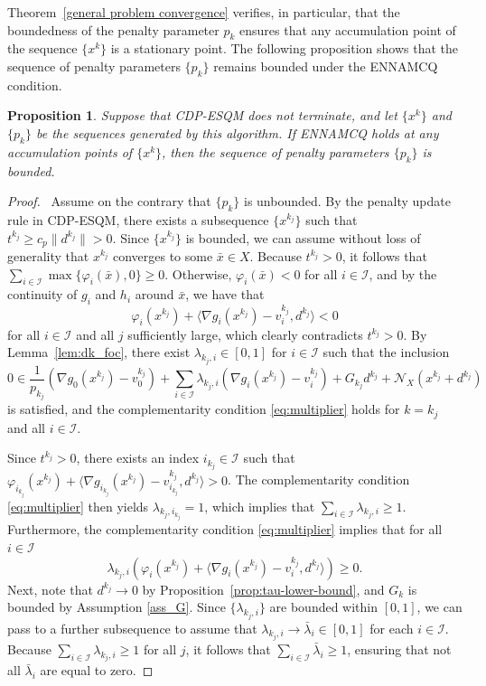 \documentclass[11pt,a4paper]{article}
\newtheorem{proposition}[theorem]{Proposition}
\theoremstyle{plain}
\begin{document}
Theorem~\ref{general problem convergence} verifies, in particular, that the boundedness of the penalty parameter $p_k$ ensures that any accumulation point of the sequence $\{x^k\}$ is a stationary point. The following proposition shows that the sequence of penalty parameters \( \{p_k\} \) remains bounded under the ENNAMCQ condition.

\begin{proposition}\label{boundedness of penalty parameter sequence}
Suppose that CDP-ESQM does not terminate, and  let \( \{x^k\} \) and $\{p_k\}$ be the sequences generated by this algorithm. If ENNAMCQ holds at any accumulation points of $\{x^{k}\}$, then the sequence of penalty parameters  $\{p_k\}$ is bounded.
\end{proposition}

\begin{proof}\,
Assume on the contrary that $\{p_k\}$ is unbounded. By the penalty update rule in CDP-ESQM, there exists a subsequence $\{x^{k_j}\}$ such that $t^{k_j} \ge c_p\|d^{k_j}\| > 0$. Since $\{x^{k_j}\}$ is bounded, we can assume without loss of generality that $x^{k_j}$ converges to some $\bar{x} \in X$. Because $t^{k_j} > 0$, it follows that $\sum_{i\in\mathcal{I}}\max\{\varphi_i(\bar{x}),0\} \ge 0$. Otherwise, $\varphi_i(\bar{x}) <0 $ for all $i\in\mathcal{I}$, and by the continuity of $g_i$ and $h_i$ around $\bar{x}$, we have that 
$$
\varphi_i(x^{k_j}) + \langle \nabla g_i(x^{k_j}) - v_i^{k_j}, d^{k_j} \rangle < 0
$$
for all $i\in\mathcal{I}$ and all $j$ sufficiently large, which clearly contradicts $t^{k_j} > 0$. 
By Lemma~\ref{lem:dk_foc}, there exist $\lambda_{k_j,i} \in [0, 1]$ for $i\in\mathcal{I}$ such that the inclusion 
\[
0 \in \frac{1}{p_{k_j}}\left(\nabla g_0(x^{k_j})-v_0^{k_j}\right) + \sum_{i\in\mathcal{I}} \lambda_{k_j,i} \left(\nabla g_i(x^{k_j})-v_i^{k_j} \right) + G_{k_j} d^{k_j}+\mathcal N_X \left(x^{k_j}+d^{k_j}\right)
\]
is satisfied, and the complementarity condition \eqref{eq:multiplier} holds for $k = k_j$ and all $i\in\mathcal{I}$. 

Since $t^{k_j} > 0$, there exists an index $i_{k_j}\in\mathcal{I}$ such that $\varphi_{i_{k_j}}(x^{k_j}) + \langle \nabla g_{i_{k_j}}(x^{k_j}) - v_{i_{k_j}}^{k_j}, d^{k_j} \rangle > 0$. The complementarity condition \eqref{eq:multiplier} then yields $\lambda_{k_j,i_{k_j}} = 1$, which implies that $\sum_{i\in\mathcal{I}} \lambda_{k_j,i} \ge 1$. Furthermore, the complementarity condition \eqref{eq:multiplier} implies that for all $i\in\mathcal{I}$
\[
 \lambda_{k_j,i} \left(\varphi_{i}(x^{k_j}) + \langle \nabla g_{i}(x^{k_j}) - v_{i}^{k_j}, d^{k_j} \rangle \right) \ge 0.
\]
Next, note that $d^{k_j} \rightarrow 0$ by Proposition~\ref{prop:tau-lower-bound}, and $G_k$ is bounded by Assumption \ref{ass_G}. Since $\{\lambda_{k_j,i}\}$ are bounded within $[0, 1]$, we can pass to a further subsequence to assume that $\lambda_{k_j,i} \to \bar{\lambda}_i \in [0, 1]$ for each $i\in\mathcal{I}$. Because $\sum_{i\in\mathcal{I}} \lambda_{k_j,i} \ge 1$ for all $j$, it follows that $\sum_{i\in\mathcal{I}} \bar{\lambda}_i \ge 1$, ensuring that not all $\bar{\lambda}_i$ are equal to zero.


\end{proof}
\end{document}

